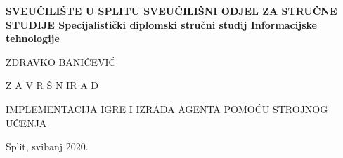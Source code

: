 %
%
\begin{titlepage}
	\bfseries
	\headerdata
	{SVEUČILIŠTE U SPLITU}
	{SVEUČILIŠNI ODJEL ZA STRUČNE STUDIJE}
	{Specijalistički diplomski stručni studij Informacijske tehnologije}
	
	\vspace*{6cm}
	\begin{center}
		{\Large ZDRAVKO BANIČEVIĆ}
		
		\vspace*{1cm}
		
		{\LARGE {Z A V R Š N I\space\space\space R A D}}
		
		\vspace*{1cm}
		\Large IMPLEMENTACIJA IGRE I IZRADA AGENTA POMOĆU STROJNOG UČENJA\\[1cm]
	
	\end{center}
	\begin{center}
		\vfill
		{\large\normalfont Split, svibanj 2020.}
	\end{center}
\end{titlepage}
%
%